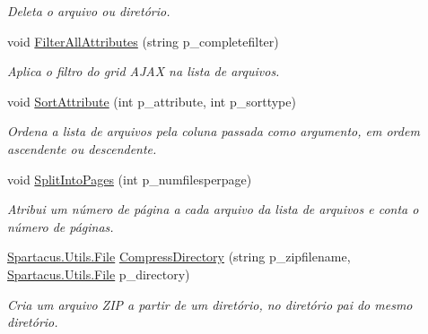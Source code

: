 \begin{DoxyCompactItemize}
\begin{DoxyCompactList}\small\item\em Deleta o arquivo ou diretório. \end{DoxyCompactList}\item 
void \hyperlink{classSpartacus_1_1Utils_1_1FileExplorer_a9f4f49e456a17be5e4051a79539b7459}{Filter\+All\+Attributes} (string p\+\_\+completefilter)
\begin{DoxyCompactList}\small\item\em Aplica o filtro do grid A\+J\+A\+X na lista de arquivos. \end{DoxyCompactList}\item 
void \hyperlink{classSpartacus_1_1Utils_1_1FileExplorer_a9d7be5225c56d655c107c0102c86ef12}{Sort\+Attribute} (int p\+\_\+attribute, int p\+\_\+sorttype)
\begin{DoxyCompactList}\small\item\em Ordena a lista de arquivos pela coluna passada como argumento, em ordem ascendente ou descendente. \end{DoxyCompactList}\item 
void \hyperlink{classSpartacus_1_1Utils_1_1FileExplorer_ad56f638a1f11734ca1157f1cdd39c7e7}{Split\+Into\+Pages} (int p\+\_\+numfilesperpage)
\begin{DoxyCompactList}\small\item\em Atribui um número de página a cada arquivo da lista de arquivos e conta o número de páginas. \end{DoxyCompactList}\item 
\hyperlink{classSpartacus_1_1Utils_1_1File}{Spartacus.\+Utils.\+File} \hyperlink{classSpartacus_1_1Utils_1_1FileExplorer_a698a5f476667204c0fbfad527371dca6}{Compress\+Directory} (string p\+\_\+zipfilename, \hyperlink{classSpartacus_1_1Utils_1_1File}{Spartacus.\+Utils.\+File} p\+\_\+directory)
\begin{DoxyCompactList}\small\item\em Cria um arquivo Z\+I\+P a partir de um diretório, no diretório pai do mesmo diretório. \end{DoxyCompactList}\end{DoxyCompactItemize}
